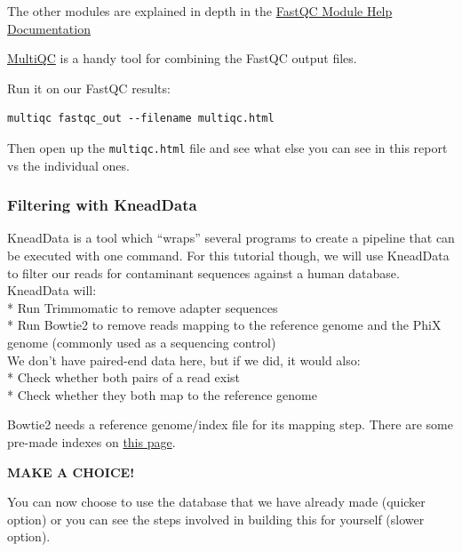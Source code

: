 \documentclass[
]{book}
\newenvironment{greenbox}{
  \definecolor{shadecolor}{RGB}{141, 181, 128}
  \color{white}
  \begin{shaded}}
 {\end{shaded}}
\begin{document}
The other modules are explained in depth in the \href{https://www.bioinformatics.babraham.ac.uk/projects/fastqc/Help/3\%20Analysis\%20Modules/}{FastQC Module Help Documentation}

\href{https://github.com/MultiQC/MultiQC}{MultiQC} is a handy tool for combining the FastQC output files.

Run it on our FastQC results:

\begin{verbatim}
multiqc fastqc_out --filename multiqc.html
\end{verbatim}

Then open up the \texttt{multiqc.html} file and see what else you can see in this report vs the individual ones.

\subsubsection{Filtering with KneadData}\label{filtering-with-kneaddata}

KneadData is a tool which ``wraps'' several programs to create a pipeline that can be executed with one command. For this tutorial though, we will use KneadData to filter our reads for contaminant sequences against a human database. KneadData will:\\
* Run Trimmomatic to remove adapter sequences\\
* Run Bowtie2 to remove reads mapping to the reference genome and the PhiX genome (commonly used as a sequencing control)\\

We don't have paired-end data here, but if we did, it would also:\\
* Check whether both pairs of a read exist\\
* Check whether they both map to the reference genome

Bowtie2 needs a reference genome/index file for its mapping step. There are some pre-made indexes on \href{https://benlangmead.github.io/aws-indexes/bowtie}{this page}.

\begin{greenbox}

\begin{center}
\textbf{MAKE A CHOICE!}

\end{center}

You can now choose to use the database that we have already made (quicker option) or you can see the steps involved in building this for yourself (slower option).

\end{greenbox}
\end{document}
